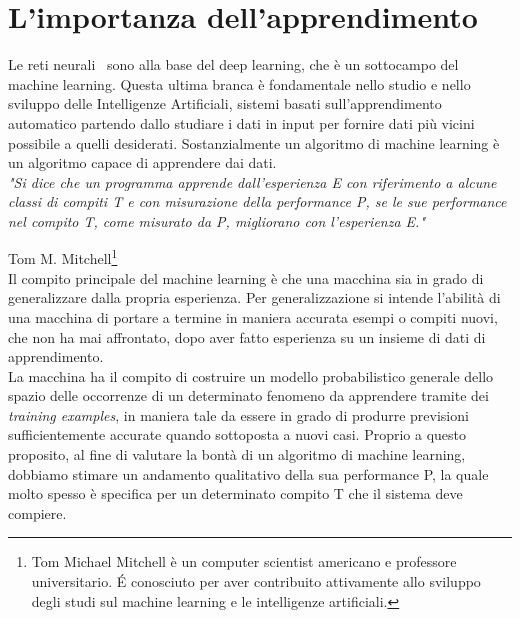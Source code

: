 \section{L'importanza dell'apprendimento}

Le reti neurali~\cite{ann} sono alla base del deep learning, che è un sottocampo del machine learning.
Questa ultima branca è fondamentale nello studio e nello sviluppo delle Intelligenze Artificiali, sistemi basati sull’apprendimento automatico partendo dallo studiare i dati in input per fornire dati più vicini possibile a quelli desiderati. 
Sostanzialmente un algoritmo di machine learning è un algoritmo capace di apprendere dai dati. \\

\emph{"Si dice che un programma apprende dall'esperienza E con riferimento a alcune classi di
 compiti T e con misurazione della performance P, se le sue performance nel compito T, come misurato da P,
  migliorano con l'esperienza E."}~\cite{learning}

Tom M. Mitchell\footnote{Tom Michael Mitchell è un computer scientist americano e professore universitario. 
É conosciuto per aver contribuito attivamente allo sviluppo degli studi sul machine learning e le intelligenze artificiali.} \\

Il compito principale del machine learning è che una macchina sia in grado di generalizzare
 dalla propria esperienza. Per generalizzazione si intende l'abilità di una macchina di portare a
  termine in maniera accurata esempi o compiti nuovi, che non ha mai affrontato, 
  dopo aver fatto esperienza su un insieme di dati di apprendimento.\\
La macchina ha il compito di costruire un modello probabilistico generale dello spazio delle 
occorrenze di un determinato fenomeno da apprendere tramite dei \emph{training examples}, in maniera 
tale da essere in grado di produrre previsioni sufficientemente accurate quando sottoposta a nuovi casi. 
Proprio a questo proposito, al fine di valutare la bontà di un algoritmo di machine learning,
 dobbiamo stimare un andamento qualitativo della sua performance P, la quale molto spesso è specifica 
 per un determinato compito T che il sistema deve compiere. 

